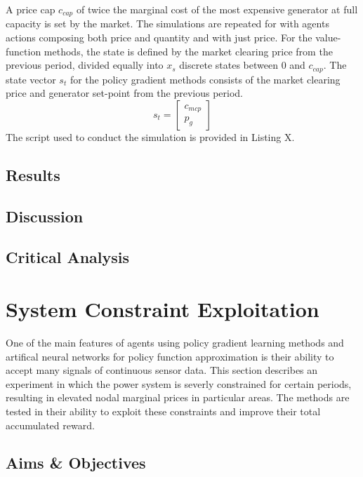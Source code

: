 A price cap $c_{cap}$ of twice the marginal cost of the most expensive generator
at full capacity is set by the market.  The simulations are repeated for with agents
actions composing both price and quantity and with just price.  For the
value-function methods, the state is defined by the market clearing price from
the previous period, divided equally into $x_s$ discrete states between $0$ and
$c_{cap}$.  The state vector $s_t$ for the policy gradient methods consists of
the market clearing price and generator set-point from the previous period.
\begin{equation}
s_t =
\begin{bmatrix}
c_{mcp}\\
p_g
\end{bmatrix}
\end{equation}
The script used to conduct the simulation is provided in Listing X.

\section{Results}
\section{Discussion}
\section{Critical Analysis}

\chapter{System Constraint Exploitation}
\label{ch:results}
One of the main features of agents using policy gradient learning methods and
artifical neural networks for policy function approximation is their ability to
accept many signals of continuous sensor data.  This section describes an
experiment in which the power system is severly constrained for certain
periods, resulting in elevated nodal marginal prices in particular areas.  The
methods are tested in their ability to exploit these constraints and improve
their total accumulated reward.

\section{Aims \& Objectives}


